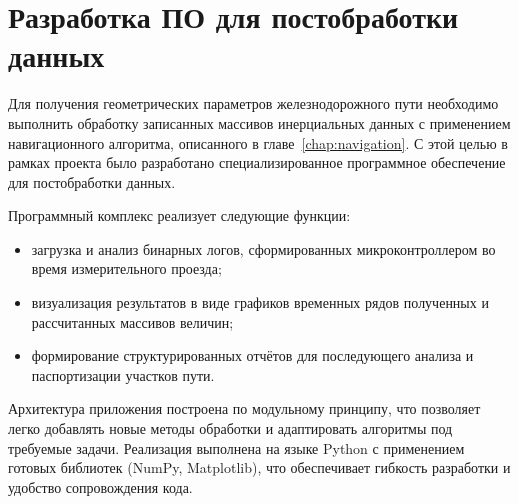\section{Разработка ПО для постобработки данных}
\label{sec:postprocessing}

Для получения геометрических параметров железнодорожного пути необходимо выполнить обработку записанных массивов инерциальных данных с применением навигационного алгоритма, описанного в главе~\ref{chap:navigation}. С этой целью в рамках проекта было разработано специализированное программное обеспечение для постобработки данных.

Программный комплекс реализует следующие функции:

\begin{itemize}
	\item загрузка и анализ бинарных логов, сформированных микроконтроллером во время измерительного проезда;
	\item визуализация результатов в виде графиков временных рядов полученных и рассчитанных массивов величин;
	\item формирование структурированных отчётов для последующего анализа и паспортизации участков пути.
\end{itemize}

Архитектура приложения построена по модульному принципу, что позволяет легко добавлять новые методы обработки и адаптировать алгоритмы под требуемые задачи. Реализация выполнена на языке Python с применением готовых библиотек (NumPy, Matplotlib), что обеспечивает гибкость разработки и удобство сопровождения кода.